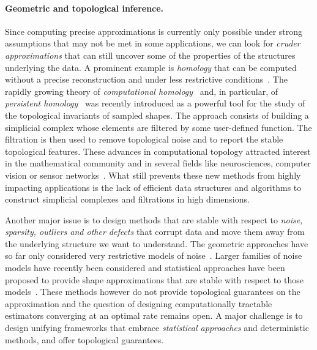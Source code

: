 \paragraph{Geometric and topological inference.}
Since computing precise approximations is currently only possible under strong assumptions that may not be met in some applications, we can look for {\em cruder approximations }
that can still  uncover some of the properties of the structures underlying the data.
%
%
A prominent example is {\em homology} that can be computed without a precise
reconstruction and under less restrictive
conditions~\cite{geometrica-ccl09,nsw-fhm-2008}. The rapidly growing
theory of {\em computational homology}~\cite{kmm-ch-2003} and, in particular, of {\em persistent homology}~\cite{eh-ph-2008,rg-bptd-2008} was
recently introduced as a powerful tool for the study of the
topological invariants of sampled shapes. The approach consists of
building a simplicial complex whose elements are filtered by some
user-defined function. The filtration is then used to remove
topological noise and to report the stable topological features.
These advances in computational topology attracted interest in the
mathematical community and in several fields like neurosciences,
computer vision or sensor
networks~\cite{fpgo-airc-2009,cids-lbsni-2008,dsrg-csnph-2007}.  What
still prevents these new methods from highly impacting applications is
the lack of efficient data structures and algorithms to construct
simplicial complexes and filtrations in high dimensions.

Another major issue is to design methods that are stable with respect
to {\em noise, sparsity, outliers and other defects} that corrupt data
and move them away from the underlying structure we want to
understand. The geometric approaches have so far only considered very restrictive models of noise~\cite{nsw-fhm-2008}.  Larger families of noise models have recently been considered and statistical approaches have been proposed to provide shape approximations that are stable with respect to those models~\cite{gpvw-mme-2011}. These methods however do not provide topological guarantees on the approximation and the question of designing computationally tractable estimators converging at an optimal rate remains open. A major challenge is to design unifying frameworks that embrace {\em statistical approaches} and deterministic methods, and offer topological guarantees.  

